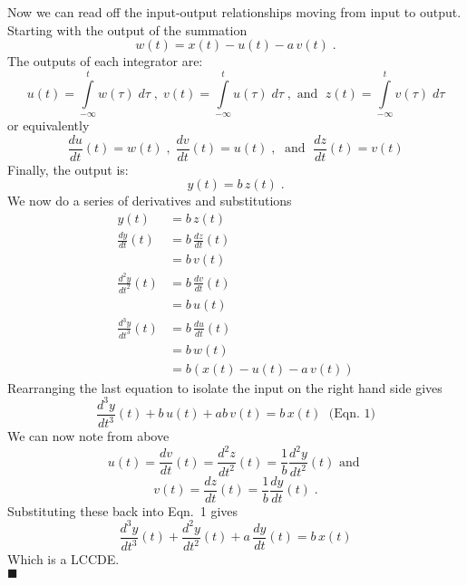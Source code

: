 \begin{enumerate}
\begin{center}
\end{center}
Now we can read off the input-output relationships moving from input to output. Starting with the output of the summation
\[
w(t) = x(t) - u(t) -a\,v(t) \; .
\]
The outputs of each integrator are:
\[
u(t) = \int\limits_{-\infty}^t w(\tau) \; d\tau\;, \;
v(t) = \int\limits_{-\infty}^t u(\tau) \; d\tau\;, \mbox{ and }\;
z(t) = \int\limits_{-\infty}^t v(\tau) \; d\tau
\]
or equivalently
\[
\frac{du}{dt}(t) = w(t)\;,\; \frac{dv}{dt}(t) = u(t)\; ,\; \mbox{ and }\; \frac{dz}{dt}(t) = v(t)
\]
Finally, the output is:
\[
y(t) = b\, z(t)\; .
\]
We now do a series of derivatives and substitutions
\begin{align*}
  y(t) &= b\, z(t)\\
  \frac{dy}{dt}(t) &= b\, \frac{dz}{dt}(t)\\
  &= b\, v(t)\\
  \frac{d^2y}{dt^2}(t) &= b\, \frac{dv}{dt}(t)\\
  &= b\, u(t)\\
  \frac{d^3y}{dt^3}(t) &= b\, \frac{du}{dt}(t)\\
  &= b\, w(t)\\
  &= b\left( x(t) - u(t) -a\,v(t)\right)
\end{align*}
Rearranging the last equation to isolate the input on the right hand side gives
\[
\frac{d^3y}{dt^3}(t) + b\,u(t) +ab\,v(t) = b\,x(t)\; \mbox{ (Eqn.~1)}
\]
We can now note from above
\[
u(t) = \frac{dv}{dt}(t) =  \frac{d^2z}{dt^2}(t) = \frac{1}{b} \frac{d^2y}{dt^2}(t) \mbox{ and }
\]
\[
v(t) = \frac{dz}{dt}(t) = \frac{1}{b} \frac{dy}{dt}(t)\; .
\]
Substituting these back into Eqn.~1 gives
\[
\frac{d^3y}{dt^3}(t) + \frac{d^2y}{dt^2}(t) +a\,\frac{dy}{dt}(t) = b\,x(t)
\]
Which is a LCCDE.\\
$\blacksquare$
\end{enumerate}

